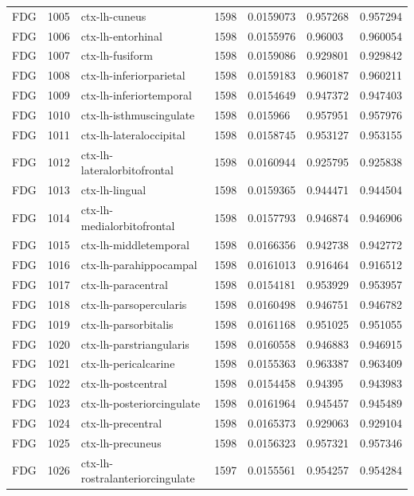 \begin{landscape}
\begin{longtable}{lllllll}
FDG & 1005 & ctx-lh-cuneus & 1598 & 0.0159073 & 0.957268 & 0.957294 \\
FDG & 1006 & ctx-lh-entorhinal & 1598 & 0.0155976 & 0.96003 & 0.960054 \\
FDG & 1007 & ctx-lh-fusiform & 1598 & 0.0159086 & 0.929801 & 0.929842 \\
FDG & 1008 & ctx-lh-inferiorparietal & 1598 & 0.0159183 & 0.960187 & 0.960211 \\
FDG & 1009 & ctx-lh-inferiortemporal & 1598 & 0.0154649 & 0.947372 & 0.947403 \\
FDG & 1010 & ctx-lh-isthmuscingulate & 1598 & 0.015966 & 0.957951 & 0.957976 \\
FDG & 1011 & ctx-lh-lateraloccipital & 1598 & 0.0158745 & 0.953127 & 0.953155 \\
FDG & 1012 & ctx-lh-lateralorbitofrontal & 1598 & 0.0160944 & 0.925795 & 0.925838 \\
FDG & 1013 & ctx-lh-lingual & 1598 & 0.0159365 & 0.944471 & 0.944504 \\
FDG & 1014 & ctx-lh-medialorbitofrontal & 1598 & 0.0157793 & 0.946874 & 0.946906 \\
FDG & 1015 & ctx-lh-middletemporal & 1598 & 0.0166356 & 0.942738 & 0.942772 \\
FDG & 1016 & ctx-lh-parahippocampal & 1598 & 0.0161013 & 0.916464 & 0.916512 \\
FDG & 1017 & ctx-lh-paracentral & 1598 & 0.0154181 & 0.953929 & 0.953957 \\
FDG & 1018 & ctx-lh-parsopercularis & 1598 & 0.0160498 & 0.946751 & 0.946782 \\
FDG & 1019 & ctx-lh-parsorbitalis & 1598 & 0.0161168 & 0.951025 & 0.951055 \\
FDG & 1020 & ctx-lh-parstriangularis & 1598 & 0.0160558 & 0.946883 & 0.946915 \\
FDG & 1021 & ctx-lh-pericalcarine & 1598 & 0.0155363 & 0.963387 & 0.963409 \\
FDG & 1022 & ctx-lh-postcentral & 1598 & 0.0154458 & 0.94395 & 0.943983 \\
FDG & 1023 & ctx-lh-posteriorcingulate & 1598 & 0.0161964 & 0.945457 & 0.945489 \\
FDG & 1024 & ctx-lh-precentral & 1598 & 0.0165373 & 0.929063 & 0.929104 \\
FDG & 1025 & ctx-lh-precuneus & 1598 & 0.0156323 & 0.957321 & 0.957346 \\
FDG & 1026 & ctx-lh-rostralanteriorcingulate & 1597 & 0.0155561 & 0.954257 & 0.954284 \\

\end{longtable}
\end{landscape}
